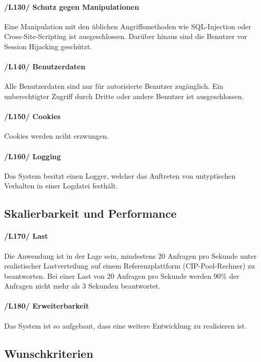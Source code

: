 \documentclass{article}
\begin{document}
    \paragraph{/L130/ \label{L130} Schutz gegen Manipulationen} Eine Manipulation mit den üblichen Angriffsmethoden wie SQL-Injection oder Cross-Site-Scripting ist ausgeschlossen. Darüber hinaus sind die Benutzer vor Session Hijacking geschützt.
   
    \paragraph{/L140/ \label{L140} Benutzerdaten}
   Alle Benutzerdaten sind nur für autorisierte Benutzer zugänglich.
   Ein unberechtigter Zugriff durch Dritte oder andere Benutzer ist ausgeschlossen.

   \paragraph{/L150/ \label{L150} Cookies}
   Cookies werden nciht erzwungen.
   
   \paragraph{/L160/ \label{L160} Logging}
    Das System besitzt einen Logger, welcher das Auftreten von untyptischen Verhalten in einer Logdatei festhält.

 \subsection{Skalierbarkeit und Performance}
	        \paragraph{
	        /L170/ \label{L170} Last}
	       Die Anwendung ist in der Lage sein, mindestens 20 Anfragen pro Sekunde unter realistischer Lastverteilung auf einem Referenzplattform (CIP-Pool-Rechner) zu beantworten. Bei einer Last von 20 Anfragen pro Sekunde werden 90\% der Anfragen nicht mehr als 3 Sekunden beantwortet.
	       \paragraph{
	        /L180/ \label{L180} Erweiterbarkeit} Das System ist so aufgebaut, dass eine weitere Entwicklung zu  realisieren  ist.
	
\subsection{Wunschkriterien}
\end{document}

